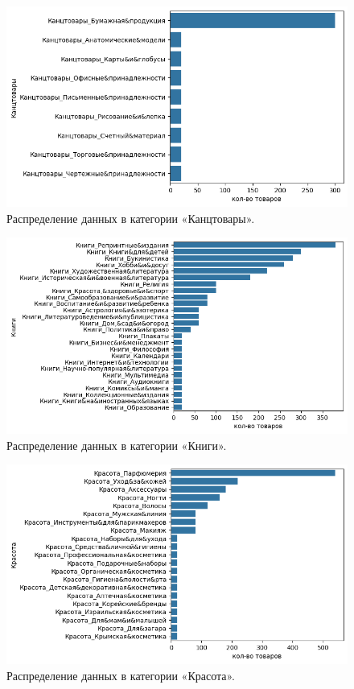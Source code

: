 \documentclass[a4paper,12pt]{extarticle}
\begin{document}
\begin{figure}[hbtp]
	\centering
	\includegraphics[scale=0.8]{приложения/amount_of_category_Канцтовары.png}
	\caption{Распределение данных в категории «Канцтовары».}
	\label{fig:amount_of_category_Канцтовары}
\end{figure}

\begin{figure}[hbtp]
	\centering
	\includegraphics[scale=0.8]{приложения/amount_of_category_Книги.png}
	\caption{Распределение данных в категории «Книги».}
	\label{fig:amount_of_category_Книги}
\end{figure}

\begin{figure}[hbtp]
	\centering
	\includegraphics[scale=0.8]{приложения/amount_of_category_Красота.png}
	\caption{Распределение данных в категории «Красота».}
	\label{fig:amount_of_category_Красота}
\end{figure}
\end{document}
